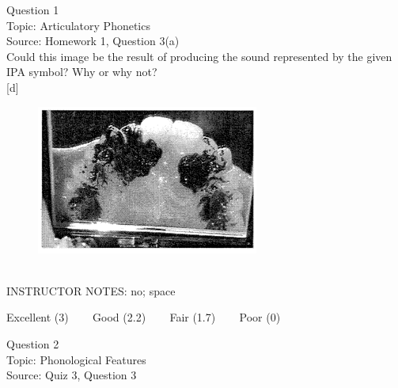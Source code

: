 \documentclass[12pt]{article}
\begin{document}
\begin{center}
\textbf{{\color{violet}{\HUGE 20201110 Tuesday\\}}}

\textbf{{\color{violet}{\HUGE ALL EXAMS (with notes)\\}}}

\end{center}
\newpage

\begin{center}
\textbf{{\color{blue}{\HUGE START OF EXAM\\}}}

\textbf{{\color{blue}{\HUGE Student ID: 29164\\}}}

\textbf{{\color{blue}{\HUGE 9:00\\}}}

\end{center}
\newpage

{\large Question 1}\\

Topic: Articulatory Phonetics\\
Source: Homework 1, Question 3(a)\\

Could this image be the result of producing the sound represented by the given IPA symbol? Why or why not?\\

{[d]}

\begin{figure}[H]
\includegraphics{../images/staticpalatography_fricative.png}
\end{figure}

~\\
INSTRUCTOR NOTES: no; space


\vfill
Excellent (3) ~~~ Good (2.2) ~~~ Fair (1.7) ~~~ Poor (0)
\newpage

{\large Question 2}\\

Topic: Phonological Features\\
Source: Quiz 3, Question 3\\
\end{document}
